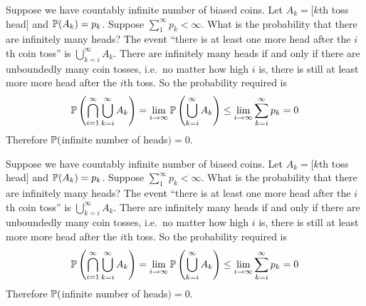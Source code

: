 \begin{note}
  \begin{field}
    \begin{eg}
      Suppose we have countably infinite number of biased coins. Let $A_k = [k$th toss head$]$ and $\P(A_k) = p_k$. Suppose $\sum_1^\infty p_k < \infty$. What is the probability that there are infinitely many heads?
      The event ``there is at least one more head after the $i$th coin toss'' is $\bigcup_{k = i}^\infty A_k$. There are infinitely many heads if and only if there are unboundedly many coin tosses, i.e.\ no matter how high $i$ is, there is still at least more more head after the $i$th toss.
      So the probability required is
      \[
        \P\left(\bigcap_{i = 1}^\infty\bigcup _{k = i}^\infty A_k\right) = \lim_{i \to \infty} \P\left(\bigcup_{k = i}^\infty A_k\right) \leq \lim_{i\to \infty}\sum_{k = i}^\infty p_k = 0
      \]
      Therefore $\P($infinite number of heads$) = 0$.
    \end{eg}
  \end{field}
  \begin{field}
    \begin{eg}
      Suppose we have countably infinite number of biased coins. Let $A_k = [k$th toss head$]$ and $\P(A_k) = p_k$. Suppose $\sum_1^\infty p_k < \infty$. What is the probability that there are infinitely many heads?
      The event ``there is at least one more head after the $i$th coin toss'' is $\bigcup_{k = i}^\infty A_k$. There are infinitely many heads if and only if there are unboundedly many coin tosses, i.e.\ no matter how high $i$ is, there is still at least more more head after the $i$th toss.
      So the probability required is
      \[
        \P\left(\bigcap_{i = 1}^\infty\bigcup _{k = i}^\infty A_k\right) = \lim_{i \to \infty} \P\left(\bigcup_{k = i}^\infty A_k\right) \leq \lim_{i\to \infty}\sum_{k = i}^\infty p_k = 0
      \]
      Therefore $\P($infinite number of heads$) = 0$.
    \end{eg}
  \end{field}
  \xplain{}%
\end{note}

